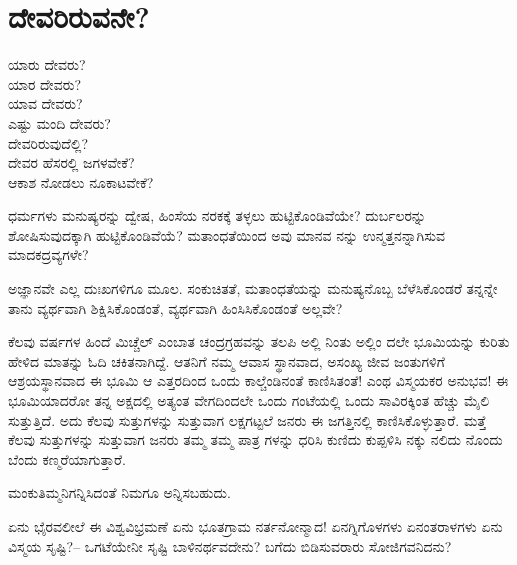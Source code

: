
\chapter{ದೇವರಿರುವನೇ?}

ಯಾರು ದೇವರು?\\ಯಾರ ದೇವರು?\\ಯಾವ ದೇವರು?\\ಎಷ್ಟು ಮಂದಿ ದೇವರು?\\ದೇವರಿರುವುದೆಲ್ಲಿ?\\ದೇವರ ಹೆಸರಲ್ಲಿ ಜಗಳವೇಕೆ?\\ಆಕಾಶ ನೋಡಲು ನೂಕಾಟವೇಕೆ?

ಧರ್ಮಗಳು ಮನುಷ್ಯರನ್ನು ದ್ವೇಷ, ಹಿಂಸೆಯ ನರಕಕ್ಕೆ ತಳ್ಳಲು ಹುಟ್ಟಿಕೊಂಡಿವೆಯೇ? ದುರ್ಬಲರನ್ನು ಶೋಷಿಸುವುದಕ್ಕಾಗಿ ಹುಟ್ಟಿಕೊಂಡಿವೆಯೆ? ಮತಾಂಧತೆಯಿಂದ ಅವು ಮಾನವ ನನ್ನು ಉನ್ಮತ್ತನನ್ನಾಗಿಸುವ ಮಾದಕದ್ರವ್ಯಗಳೇ?

ಅಜ್ಞಾನವೇ ಎಲ್ಲ ದುಃಖಗಳಿಗೂ ಮೂಲ. ಸಂಕುಚಿತತೆ, ಮತಾಂಧತೆಯನ್ನು ಮನುಷ್ಯನೊಬ್ಬ ಬೆಳೆಸಿಕೊಂಡರೆ ತನ್ನನ್ನೇ ತಾನು ವ್ಯರ್ಥವಾಗಿ ಶಿಕ್ಷಿಸಿಕೊಂಡಂತೆ, ವ್ಯರ್ಥವಾಗಿ ಹಿಂಸಿಸಿಕೊಂಡಂತೆ ಅಲ್ಲವೇ?

ಕೆಲವು ವರ್ಷಗಳ ಹಿಂದೆ ಮಿಚ್ಚೆಲ್ ಎಂಬಾತ ಚಂದ್ರಗ್ರಹವನ್ನು ತಲಪಿ ಅಲ್ಲಿ ನಿಂತು ಅಲ್ಲಿಂ ದಲೇ ಭೂಮಿಯನ್ನು ಕುರಿತು ಹೇಳಿದ ಮಾತನ್ನು ಓದಿ ಚಕಿತನಾಗಿದ್ದೆ. ಆತನಿಗೆ ನಮ್ಮ ಆವಾಸ ಸ್ಥಾನವಾದ, ಅಸಂಖ್ಯ ಜೀವ ಜಂತುಗಳಿಗೆ ಆಶ್ರಯಸ್ಥಾನವಾದ ಈ ಭೂಮಿ ಆ ಎತ್ತರದಿಂದ ಒಂದು ಕಾಲ್ಚೆಂಡಿನಂತೆ ಕಾಣಿಸಿತಂತೆ! ಎಂಥ ವಿಸ್ಮಯಕರ ಅನುಭವ! ಈ ಭೂಮಿಯಾದರೋ ತನ್ನ ಅಕ್ಷದಲ್ಲಿ ಅತ್ಯಂತ ವೇಗದಿಂದಲೇ ಒಂದು ಗಂಟೆಯಲ್ಲಿ ಒಂದು ಸಾವಿರಕ್ಕಿಂತ ಹೆಚ್ಚು ಮೈಲಿ ಸುತ್ತುತ್ತಿದೆ. ಅದು ಕೆಲವು ಸುತ್ತುಗಳನ್ನು ಸುತ್ತುವಾಗ ಲಕ್ಷಗಟ್ಟಲೆ ಜನರು ಈ ಜಗತ್ತಿನಲ್ಲಿ ಕಾಣಿಸಿಕೊಳ್ಳುತ್ತಾರೆ. ಮತ್ತೆ ಕೆಲವು ಸುತ್ತುಗಳನ್ನು ಸುತ್ತುವಾಗ ಜನರು ತಮ್ಮ ತಮ್ಮ ಪಾತ್ರ ಗಳನ್ನು ಧರಿಸಿ ಕುಣಿದು ಕುಪ್ಪಳಿಸಿ ನಕ್ಕು ನಲಿದು ನೊಂದು ಬೆಂದು ಕಣ್ಮರೆಯಾಗುತ್ತಾರೆ.

ಮಂಕುತಿಮ್ಮನಿಗನ್ನಿಸಿದಂತೆ ನಿಮಗೂ ಅನ್ನಿಸಬಹುದು.

ಏನು ಭೈರವಲೀಲೆ ಈ ವಿಶ್ವವಿಭ್ರಮಣೆ ಏನು ಭೂತಗ್ರಾಮ ನರ್ತನೋನ್ಮಾದ! ಏನಗ್ನಿಗೊಳಗಳು ಏನಂತರಾಳಗಳು ಏನು ವಿಸ್ಮಯ ಸೃಷ್ಟಿ?– ಒಗಟೆಯೇನೀ ಸೃಷ್ಟಿ ಬಾಳಿನರ್ಥವದೇನು? ಬಗೆದು ಬಿಡಿಸುವರಾರು ಸೋಜಿಗವನಿದನು?

